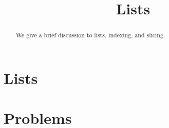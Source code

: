 \documentclass{ximera}
\title{Lists}
\begin{document}
  
\begin{abstract}  
We give a brief discussion to lists, indexing, and slicing.
\end{abstract}  
\maketitle

\section{Lists}



\section{Problems}

\begin{question}
\end{question}

\begin{question}
\end{question}
\end{document}
